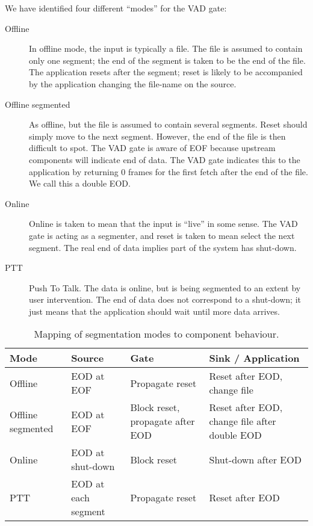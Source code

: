 We have identified four different ``modes'' for the VAD gate:
\begin{description}
\item[Offline] In offline mode, the input is typically a file.  The
  file is assumed to contain only one segment; the end of the segment
  is taken to be the end of the file.  The application resets after
  the segment; reset is likely to be accompanied by the application
  changing the file-name on the source.
\item[Offline segmented] As offline, but the file is assumed to
  contain several segments.  Reset should simply move to the next
  segment.  However, the end of the file is then difficult to spot.
  The VAD gate is aware of EOF because upstream components will
  indicate end of data.  The VAD gate indicates this to the
  application by returning 0 frames for the first fetch after the end
  of the file.  We call this a double EOD.
\item[Online] Online is taken to mean that the input is ``live'' in
  some sense.  The VAD gate is acting as a segmenter, and reset is
  taken to mean select the next segment.  The real end of data implies
  part of the system has shut-down.
\item[PTT] Push To Talk.  The data is online, but is being segmented
  to an extent by user intervention.  The end of data does not
  correspond to a shut-down; it just means that the application should
  wait until more data arrives.
\end{description}

\begin{table}[htb]
  \centering
  \begin{tabular}{|m{2cm}|m{3cm}|m{3cm}|m{3cm}|}
    \hline
    {\bf Mode} & {\bf Source} & {\bf Gate} & {\bf Sink / Application} \\
    \hline\hline
    Offline
    & EOD at EOF
    & Propagate reset
    & Reset after EOD, change file \\
    \hline
    Offline segmented
    & EOD at EOF
    & Block reset, propagate after EOD
    & Reset after EOD, change file after double EOD \\
    \hline
    Online
    & EOD at shut-down
    & Block reset
    & Shut-down after EOD \\
    \hline
    PTT
    & EOD at each segment
    & Propagate reset
    & Reset after EOD \\
    \hline
  \end{tabular}
  \caption{Mapping of segmentation modes to component behaviour.}
  \label{tab:SegmentationMode}
\end{table}

